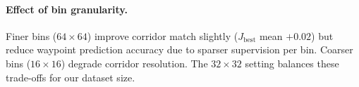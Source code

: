 \paragraph{Effect of bin granularity.}
Finer bins ($64 \times 64$) improve corridor match slightly ($J_{\mathrm{best}}$ mean $+0.02$) but reduce waypoint prediction accuracy due to sparser supervision per bin.
Coarser bins ($16 \times 16$) degrade corridor resolution.
The $32 \times 32$ setting balances these trade-offs for our dataset size.
